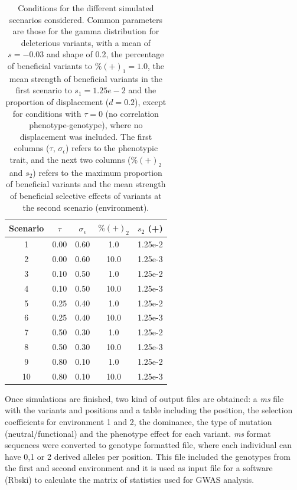 \documentclass[a4paper,11pt]{article}
\begin{document}
\begin{table}[h]
\begin{center}\begin{tabular}{ccccc}
Scenario & $\tau$ & $\sigma_{\epsilon}$ & $\%(+)_2$ & $s_2$ (+)\\
\hline
1  & 0.00 & 0.60& 1.0   & 1.25e-2 \\
2  & 0.00 & 0.60 & 10.0 & 1.25e-3\\
3  & 0.10 & 0.50 & 1.0   & 1.25e-2\\
4  & 0.10 & 0.50 & 10.0 & 1.25e-3\\
5  & 0.25 & 0.40 & 1.0   & 1.25e-2\\
6  & 0.25 & 0.40 & 10.0 & 1.25e-3\\
7  & 0.50 & 0.30 & 1.0   & 1.25e-2\\
8  & 0.50 & 0.30 & 10.0 & 1.25e-3\\
9  & 0.80 & 0.10 & 1.0   & 1.25e-2\\
10 & 0.80 & 0.10 & 10.0 & 1.25e-3\\
\hline
\end{tabular} 
\caption{Conditions for the different simulated scenarios considered. Common parameters are those for the gamma distribution for deleterious variants, with a mean of $s=-0.03$ and shape of 0.2, the percentage of beneficial variants to $\%(+)_1=1.0$, the mean strength of beneficial variants in the first scenario to $s_1=1.25e-2$ and the proportion of displacement ($d=0.2$), except for conditions with $\tau=0$ (no correlation phenotype-genotype), where no displacement was included. The first columns ($\tau$, $\sigma_{\epsilon}$) refers to the phenotypic trait, and the next two columns ($\%(+)_2$ and $s_2$) refers to the maximum proportion of beneficial variants and the mean strength of beneficial selective effects of variants at the second scenario (environment).}
\label{tablescen}
\end{center}
\end{table}

\noindent Once simulations are finished, two kind of  output files are obtained: a \textit{ms} file with the variants and positions and a table including the position, the selection coefficients for environment 1 and 2, the dominance, the type of mutation (neutral/functional) and the phenotype effect for each variant.  \textit{ms} format sequences were converted to genotype formatted file, where each individual can have 0,1 or 2 derived alleles per position. This file included the genotypes from the first and second environment and it is used as input file for a software (Rbski) to calculate the matrix of statistics used for GWAS analysis.
\end{document}
